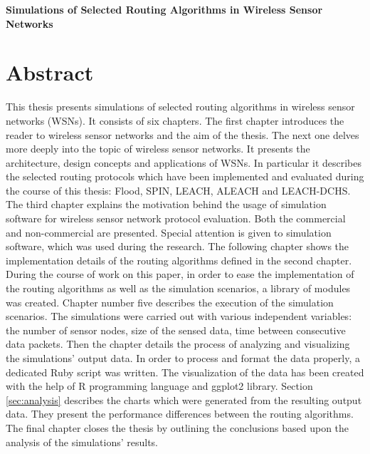 \vskip 2cm


\begin{center}
\large \bf
Simulations of Selected Routing Algorithms in Wireless Sensor Networks
\end{center}

\section*{Abstract}
This thesis presents simulations of selected routing algorithms in wireless sensor networks (WSNs). It consists of six chapters. The first chapter introduces the reader to wireless sensor networks and the aim of the thesis. The next one delves more deeply into the topic of wireless sensor networks. It presents the architecture, design concepts and applications of WSNs. In particular it describes the selected routing protocols which have been implemented and evaluated during the course of this thesis: Flood, SPIN, LEACH, ALEACH and LEACH-DCHS. The third chapter explains the motivation behind the usage of simulation software for wireless sensor network protocol evaluation. Both the commercial and non-commercial are presented. Special attention is given to \omnetpp simulation software, which was used during the research. The following chapter shows the implementation details of the routing algorithms defined in the second chapter. During the course of work on this paper, in order to ease the implementation of the routing algorithms as well as the simulation scenarios, a library of \omnetpp modules was created. Chapter number five describes the execution of the simulation scenarios. The simulations were carried out with various independent variables: the number of sensor nodes, size of the sensed data, time between consecutive data packets. Then the chapter details the process of analyzing and visualizing the simulations' output data. In order to process and format the data properly, a dedicated Ruby script was written. The visualization of the data has been created with the help of R programming language and ggplot2 library. Section \ref{sec:analysis} describes the charts which were generated from the resulting output data. They present the performance differences between the routing algorithms. The final chapter closes the thesis by outlining the conclusions based upon the analysis of the simulations' results.    

\vfill